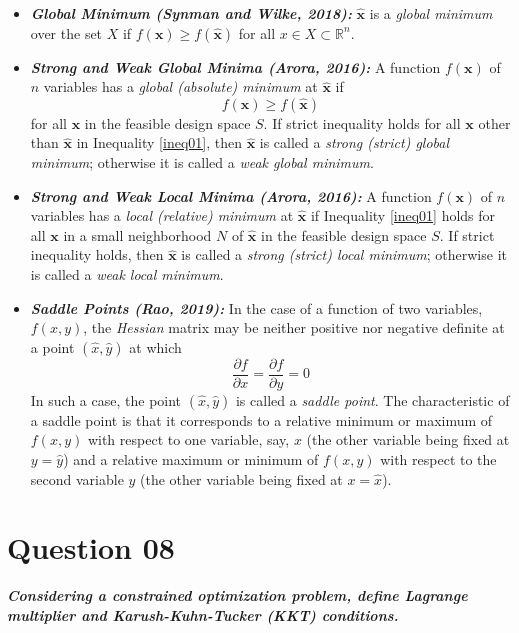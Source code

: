 \documentclass[conference]{IEEEtran}
\begin{document}
\begin{itemize}
	\item \textbf{\textit{Global Minimum (Synman and Wilke, 2018):}} $\hat{\mathbf{x}}$ is a \textit{global minimum} over the set $X$ if $f (\mathbf{x}) \geq f(\hat{\mathbf{x}})$ for all $x \in X \subset \mathbb{R} ^ n $.
	\item \textbf{\textit{Strong and Weak Global Minima (Arora, 2016):}} A function $f(\mathbf{x})$ of $n$ variables has a \textit{global (absolute) minimum} at $\hat{\mathbf{x}}$ if 
		\begin{equation}
			f(\mathbf{x}) \geq f(\hat{\mathbf{x}})
			\label{ineq01}
		\end{equation}
	for all $\mathbf{x}$ in the feasible design space $S$. If strict inequality holds for all $\mathbf{x}$ other than $\hat{\mathbf{x}}$ in Inequality \ref{ineq01}, then  $\hat{\mathbf{x}}$ is called a \textit{strong (strict) global minimum}; otherwise it is called a \textit{weak global minimum}.
	\item \textbf{\textit{Strong and Weak Local Minima (Arora, 2016):}} A function $f(\mathbf{x})$ of $n$ variables has a \textit{local (relative) minimum}	at $\hat{\mathbf{x}}$ if Inequality \ref{ineq01} holds for all $\mathbf{x}$ in a small neighborhood $N$ of $\hat{\mathbf{x}}$ in the feasible design space $S$. If strict inequality holds, then $\hat{\mathbf{x}}$ is called a \textit{strong (strict) local minimum}; otherwise it is called a \textit{weak local minimum}.
	\item \textbf{\textit{Saddle Points (Rao, 2019):}} In the case of a function of two variables, $f (x, y)$, the \textit{Hessian} matrix may be neither positive nor negative definite at a point $(\hat{x}, \hat{y})$ at which
	\begin{equation}
		\frac{\partial f}{\partial x} = \frac{\partial f}{\partial y} = 0
		\label{saddlecond}
	\end{equation}
	In such a case, the point $(\hat{x}, \hat{y})$ is called a \textit{saddle point}. The characteristic of a saddle
	point is that it corresponds to a relative minimum or maximum of $f(x, y)$ with respect to one variable, say, $x$ (the other variable being fixed at $y = \hat{y}$) and a relative maximum or minimum of $f(x, y)$ with respect to the second variable $y$ (the other variable being	fixed at $x = \hat{x}$).
\end{itemize}

\section{Question 08}
\textbf{\textit{Considering a constrained optimization problem, define Lagrange multiplier and Karush-Kuhn-Tucker (KKT) conditions.}}
\end{document}
